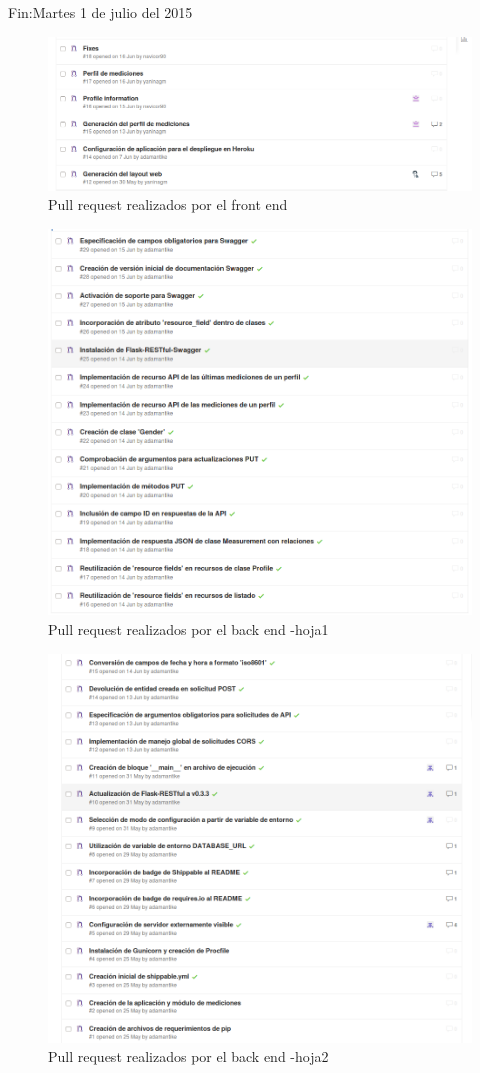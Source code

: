 \documentclass[a4paper,12pt]{article}
\begin{document}
Fin:Martes 1 de julio del 2015 
\begin{figure}[h]
  \centering
  \includegraphics[width=.8\textwidth]{img/2-PR}
  \caption{Pull request realizados por el front end}
  \label{2-PR}
\end{figure}
\begin{figure}[h]
  \centering
  \includegraphics[width=.8\textwidth]{img/2-PR_back2}
  \caption{Pull request realizados por el back end -hoja1}
  \label{2-PR_back2}
\end{figure}
\begin{figure}[h]
  \centering
  \includegraphics[width=.8\textwidth]{img/2-PR_Back}
  \caption{Pull request realizados por el back end -hoja2}
  \label{2-PR_Back}
\end{figure}
\end{document}
